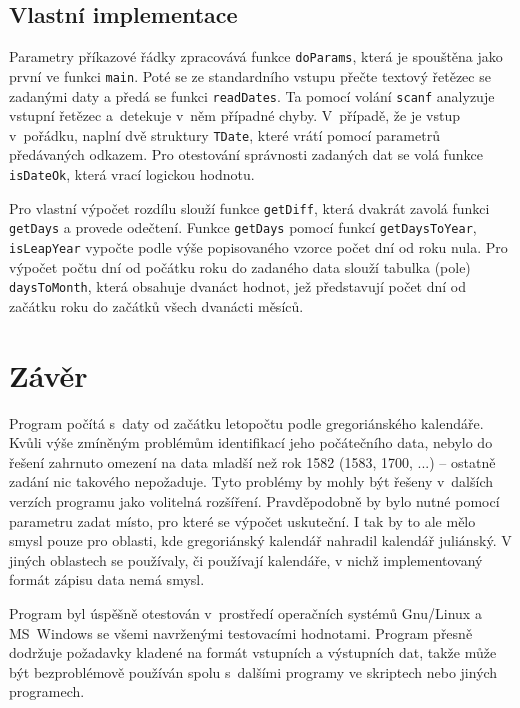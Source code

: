 \documentclass[12pt,a4paper,titlepage,final]{article}
\begin{document}
\subsection{Vlastní implementace}

Parametry příkazové řádky zpracovává funkce \texttt{doParams}, která je
spouštěna jako první ve funkci \texttt{main}. Poté se ze standardního vstupu
přečte textový řetězec se zadanými daty a předá se funkci \texttt{readDates}.
Ta pomocí volání \texttt{scanf} analyzuje vstupní řetězec a~detekuje v~něm
případné chyby. V~případě, že je vstup v~pořádku, naplní dvě struktury
\texttt{TDate}, které vrátí pomocí parametrů předávaných odkazem. Pro
otestování správnosti zadaných dat se volá funkce \texttt{isDateOk}, která
vrací logickou hodnotu.

Pro vlastní výpočet rozdílu slouží funkce \texttt{getDiff}, která dvakrát
zavolá funkci \texttt{getDays} a provede odečtení. Funkce \texttt{getDays}
pomocí funkcí \texttt{getDaysToYear}, \texttt{isLeapYear} vypočte podle výše
popisovaného vzorce počet dní od roku nula. Pro výpočet počtu dní od počátku
roku do zadaného data slouží tabulka (pole) \texttt{daysToMonth}, která
obsahuje dvanáct hodnot, jež představují počet dní od začátku roku do začátků
všech dvanácti měsíců.

\section{Závěr} \label{zaver}

Program počítá s~daty od začátku letopočtu podle gregoriánského kalendáře.
Kvůli výše zmíně\-ným problémům identifikací jeho počátečního data, nebylo do
řešení zahrnuto omezení na data mladší než rok 1582 (1583, 1700, ...) --
ostatně zadání nic takového nepožaduje. Tyto problémy by mohly být řešeny
v~dalších verzích programu jako volitelná rozšíření. Pravděpodobně by bylo
nutné pomocí parametru zadat místo, pro které se výpočet uskuteční. I tak by to
ale mělo smysl pouze pro oblasti, kde gregoriánský kalendář nahradil kalendář
juliánský. V jiných oblastech se používaly, či používají kalendáře, v nichž
implementovaný formát zápisu data nemá smysl.

Program byl úspěšně otestován v~prostředí operačních systémů Gnu/Linux a
MS~Windows se všemi navrženými testovacími hodnotami.  Program přesně dodržuje
požadavky kladené na formát vstupních a výstupních dat, takže může být
bezproblémově používán spolu s~dalšími programy ve skriptech nebo jiných
programech.
\end{document}
